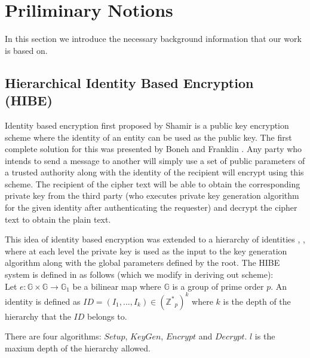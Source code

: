 \section{Priliminary Notions}

In this section we introduce the necessary background information that our work is based on.

\subsection{Hierarchical Identity Based Encryption (HIBE)}
Identity based encryption first proposed by Shamir\cite{Shamir:1985:ICS:19478.19483} is a public key encryption scheme where the identity of an entity can be used as the public key. The first complete solution for this was presented by Boneh and Franklin \cite{Boneh:2003:IEW:639069.639089}. Any party who intends to send a message to another will simply use a set of public parameters of a trusted authority along with the identity of the recipient will encrypt using this scheme. The recipient of the cipher text will be able to obtain the corresponding private key from the third party (who executes private key generation algorithm for the given identity after authenticating the requester) and decrypt the cipher text to obtain the plain text.

This idea of identity based encryption was extended to a hierarchy of identities \cite{Horwitz02towardhierarchical}, \cite{BBG05}, where at each level the private key is used as the input to the key generation algorithm along with the global parameters defined by the root. The HIBE system is defined in \cite{BBG05} as follows (which we modify in deriving out scheme):\\

Let $e : \mathbb{G} \times \mathbb{G} \to \mathbb{G}_1 $ be a bilinear map where $\mathbb{G}$ is a group of prime order $p$. An identity is defined as $ID = (I_1, ..., I_k) \in ({{\mathbb{Z}}^*}_p)^k$ where $k$ is the depth of the hierarchy that the $ID$ belongs to.

There are four algorithms: $Setup$, $KeyGen$, $Encrypt$ and $Decrypt$. $l$ is the maxium depth of the hierarchy allowed.

